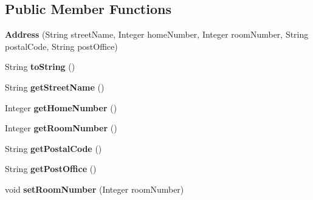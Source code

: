 \subsection*{Public Member Functions}
\begin{DoxyCompactItemize}
\item 
\mbox{\label{classcloud_1_1ptl_1_1persistence_1_1Address_ad83591046735ac0e7d88ca1da8a89d8c}} 
{\bfseries Address} (String street\+Name, Integer home\+Number, Integer room\+Number, String postal\+Code, String post\+Office)
\item 
\mbox{\label{classcloud_1_1ptl_1_1persistence_1_1Address_a2aefc513b9af1a2dc576c3cbd099370a}} 
String {\bfseries to\+String} ()
\item 
\mbox{\label{classcloud_1_1ptl_1_1persistence_1_1Address_a8d0b0b9e58efb70f6d87f388b1b99128}} 
String {\bfseries get\+Street\+Name} ()
\item 
\mbox{\label{classcloud_1_1ptl_1_1persistence_1_1Address_abdd09a9a589a3626e5ae9d9b55ee0eb6}} 
Integer {\bfseries get\+Home\+Number} ()
\item 
\mbox{\label{classcloud_1_1ptl_1_1persistence_1_1Address_a259fd5d466d576c6f5fd3693d0f54db3}} 
Integer {\bfseries get\+Room\+Number} ()
\item 
\mbox{\label{classcloud_1_1ptl_1_1persistence_1_1Address_a8b5cfda35d887e7e0c102266a7d0826a}} 
String {\bfseries get\+Postal\+Code} ()
\item 
\mbox{\label{classcloud_1_1ptl_1_1persistence_1_1Address_ae85b0f9a9ed1044c3e38178bc3c9b25d}} 
String {\bfseries get\+Post\+Office} ()
\item 
\mbox{\label{classcloud_1_1ptl_1_1persistence_1_1Address_ad3e64b1830118ca85d013d4dbd1d8b12}} 
void {\bfseries set\+Room\+Number} (Integer room\+Number)
\item 
\mbox{\label{classcloud_1_1ptl_1_1persistence_1_1Address_a8e25fa83c670ff8143823277a91b0d12}} 

\end{DoxyCompactItemize}
